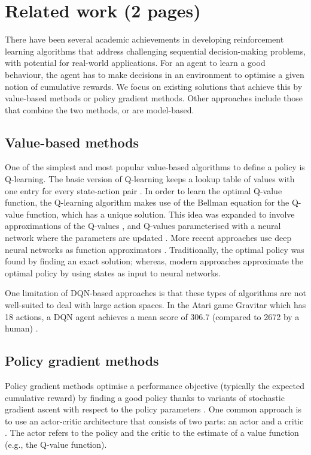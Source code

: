 \documentclass[12pt,a4paper]{article}
\begin{document}
\newpage
\section{Related work (2 pages)}
\label{section:related-work}
There have been several academic achievements in developing reinforcement learning algorithms that address challenging sequential decision-making problems, with  potential for real-world applications. For an agent to learn a good behaviour, the agent has to make decisions in an environment to optimise a given notion of cumulative rewards. We focus on existing solutions that achieve this by value-based methods or policy gradient methods. Other approaches include those that combine the two methods, or are model-based.

\subsection{Value-based methods}
One of the simplest and most popular value-based algorithms to define a policy is Q-learning. The basic version of Q-learning keeps a lookup table of values with one entry for every state-action pair \cite{DBLP:journals/corr/abs-1811-12560}. In order to learn the optimal Q-value function, the Q-learning algorithm makes use of the Bellman equation for the Q-value function, which has a unique solution. This idea was expanded to involve approximations of the Q-values \cite{10.5555/2998828.2998976}, and Q-values parameterised with a neural network where the parameters are updated \cite{10.1007/11564096_32}. More recent approaches use deep neural networks as function approximators \cite{Mnih2015}. Traditionally, the optimal policy was found by finding an exact solution; whereas, modern approaches approximate the optimal policy by using states as input to neural networks. 

One limitation of DQN-based approaches is that these types of algorithms are not well-suited to deal with large action spaces. In the Atari game Gravitar which has 18 actions, a DQN agent achieves a mean score of 306.7 (compared to 2672 by a human) \cite{Mnih2015}. 

\subsection{Policy gradient methods}
Policy gradient methods optimise a performance objective (typically the expected cumulative reward) by finding a good policy thanks to variants of stochastic gradient ascent with respect to the policy parameters \cite{DBLP:journals/corr/abs-1811-12560}. One common approach is to use an actor-critic architecture that consists of two parts: an actor and a critic \cite{article}. The actor
refers to the policy and the critic to the estimate of a value function (e.g.,
the Q-value function).
\end{document}
